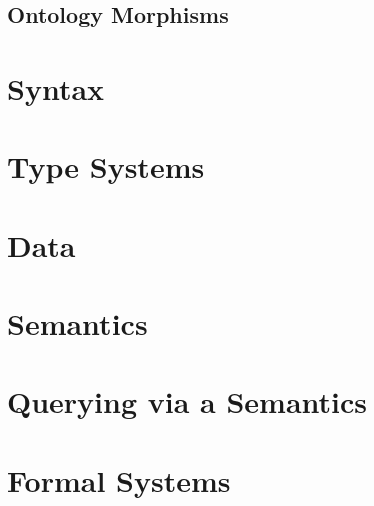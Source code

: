 \documentclass{book}
\begin{document}
 \section{Ontology Morphisms}\label{sec:onto:morph}
   

\chapter{Syntax}\label{sec:wuv:syntax}
  
  
\chapter{Type Systems}\label{sec:onto:type}
   

\chapter{Data}\label{sec:wuv:codecs}
 

\chapter{Semantics}\label{sec:bolsem}
  

\chapter{Querying via a Semantics}\label{sec:bolquery}
 

\chapter{Formal Systems}\label{sec:wuv:abstract}
  


%
%
%
%
%
%
%



\end{document}
